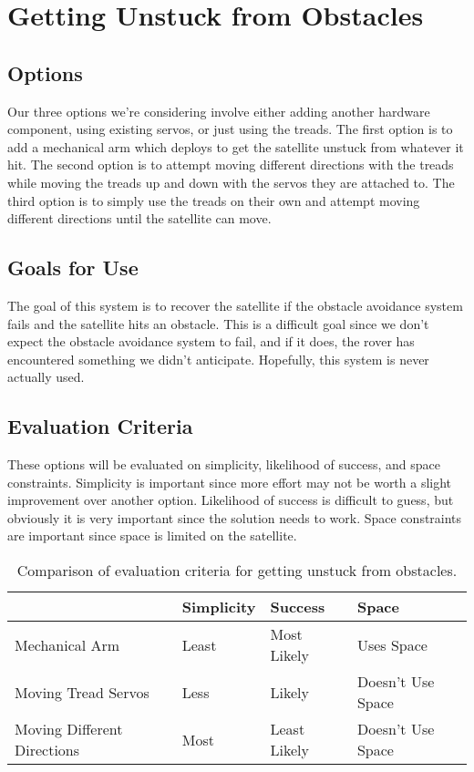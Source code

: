 \documentclass[10pt,letterpaper,onecolumn,journal]{IEEEtran}
\begin{document}
\section{Getting Unstuck from Obstacles}

\subsection{Options}
Our three options we’re considering involve either adding another hardware component, using existing servos, or just using the treads. The first option is to add a mechanical arm which deploys to get the satellite unstuck from whatever it hit. The second option is to attempt moving different directions with the treads while moving the treads up and down with the servos they are attached to. The third option is to simply use the treads on their own and attempt moving different directions until the satellite can move. 

\subsection{Goals for Use}
The goal of this system is to recover the satellite if the obstacle avoidance system fails and the satellite hits an obstacle. This is a difficult goal since we don’t expect the obstacle avoidance system to fail, and if it does, the rover has encountered something we didn’t anticipate. Hopefully, this system is never actually used. 

\subsection{Evaluation Criteria}
These options will be evaluated on simplicity, likelihood of success, and space constraints. Simplicity is important since more effort may not be worth a slight improvement over another option. Likelihood of success is difficult to guess, but obviously it is very important since the solution needs to work. Space constraints are important since space is limited on the satellite.

\begin{table}[h!]
  \centering
  \caption{Comparison of evaluation criteria for getting unstuck from obstacles.}
  \label{tab:table1}
  \begin{tabular}{l||l|l|l}
                                 & Simplicity & Success      & Space \\
    \hline
    Mechanical Arm               & Least      & Most Likely  & Uses Space  \\
    \hline
    Moving Tread Servos          & Less       & Likely       & Doesn't Use Space \\
    \hline
    Moving Different Directions  & Most       & Least Likely & Doesn't Use Space  \\
  \end{tabular}
\end{table}
\end{document}
